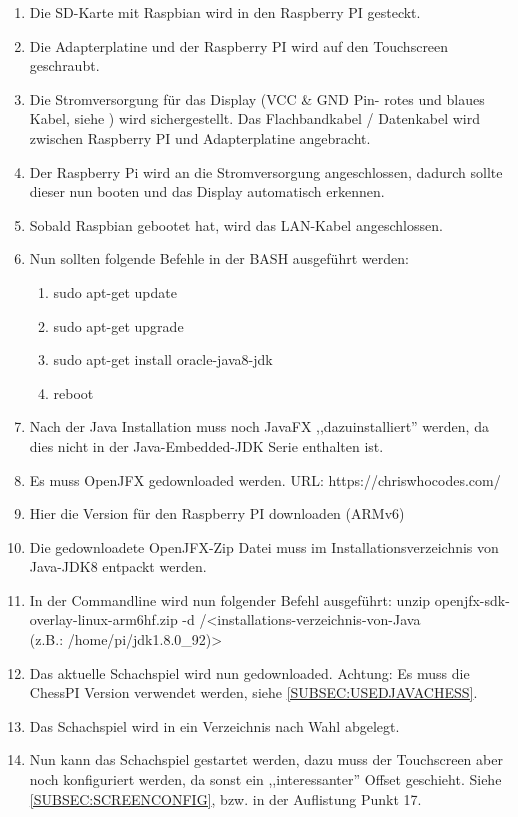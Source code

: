 \documentclass[12pt,a4paper]{article}
\begin{document}
\begin{enumerate}
	\item{Die SD-Karte mit Raspbian wird in den Raspberry PI gesteckt.}
	\item{Die Adapterplatine und der Raspberry PI wird auf den Touchscreen geschraubt.}
	\item{Die Stromversorgung für das Display (VCC \& GND Pin- rotes und blaues Kabel, siehe \cite{RaspiScreen}) wird sichergestellt. Das Flachbandkabel / Datenkabel wird zwischen Raspberry PI und Adapterplatine angebracht.}
	\item{Der Raspberry Pi wird an die Stromversorgung angeschlossen, dadurch sollte dieser nun booten und das Display automatisch erkennen.}
	\item{Sobald Raspbian gebootet hat, wird das LAN-Kabel angeschlossen.}
	\item{Nun sollten folgende Befehle in der BASH ausgeführt werden:}
	\begin{enumerate}
		\item{sudo apt-get update}
		\item{sudo apt-get upgrade}
		\item{sudo apt-get install oracle-java8-jdk}
		\item{reboot}
	\end{enumerate}
	\item{Nach der Java Installation muss noch JavaFX ,,dazuinstalliert'' werden, da dies nicht in der Java-Embedded-JDK Serie enthalten ist.}
	\item{Es muss OpenJFX gedownloaded werden. URL: https://chriswhocodes.com/}
	\item{Hier die Version für den Raspberry PI downloaden (ARMv6)}
	\item{Die gedownloadete OpenJFX-Zip Datei muss im Installationsverzeichnis von Java-JDK8 entpackt werden.}
	\item{In der Commandline wird nun folgender Befehl ausgeführt: unzip openjfx-sdk-overlay-linux-arm6hf.zip -d /<installations-verzeichnis-von-Java \\
	(z.B.: /home/pi/jdk1.8.0\_92)>}
	\item{Das aktuelle Schachspiel wird nun gedownloaded. Achtung: Es muss die ChessPI Version verwendet werden, siehe \ref{SUBSEC:USEDJAVACHESS}}.
	\item{Das Schachspiel wird in ein Verzeichnis nach Wahl abgelegt.}
	\item{Nun kann das Schachspiel gestartet werden, dazu muss der Touchscreen aber noch konfiguriert werden, da sonst ein ,,interessanter'' Offset geschieht. Siehe \ref{SUBSEC:SCREENCONFIG}, bzw. in der Auflistung Punkt 17.}

\end{enumerate}
\end{document}
